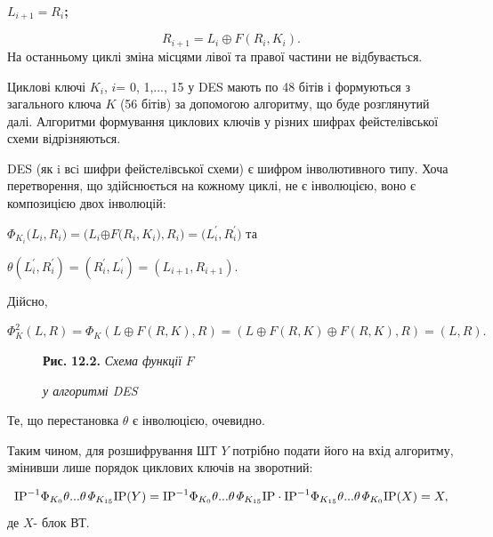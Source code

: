 \documentclass[a4paper]{article}
\newcounter{}
\newcommand\normalsubformula[1]{\text{\mathversion{normal}$#1$}}
\begin{document}
{\centering\bfseries
 ${L_{{i+1}}=R_{{i}}}$;
\par}

\begin{equation*}
{R_{{i+1}}=L_{{i}}{\oplus}F(R_{{i}},K_{{i}})\text{.}}
\end{equation*}
На останньому циклі зміна місцями лівої та правої частини не відбувається.

Циклові ключі  ${K_{{i}}}$,  ${i}$= 0, 1,..., 15 у DES мають по 48 бітів і
формуються з загального ключа  ${K}$ (56 бітів) за допомогою алгоритму, що буде
розглянутий далі. Алгоритми формування циклових ключів у різних шифрах
фейстелівської схеми відрізняються.

DES (як i всi шифри фейстелiвської схеми) є шифром  інволютивного типу. Хоча
перетворення, що здійснюється на кожному циклі, не є інволюцією, воно є
композицією  двох інволюцій:

{\centering
 ${\Phi
_{{K_{{i}}}}(L_{i}{,R_{i}}{)=(L_{i}}{{\oplus}F(R_{i}}{,K_{i}}{),R_{i}}{)=({L}_{i}^{'}}{,{R}_{i}^{'}}{)}}$\textbf{
 }та
\par}

{\centering
 ${\theta
({L}_{{i}}^{'},{R}_{{i}}^{'})=({R}_{{i}}^{'},{L}_{{i}}^{'})=(L_{{i+1}},R_{{i+1}})}$.
\par}

Дійсно,

 ${\Phi _{{K}}^{{2}}(L,R)=\Phi
_{{K}}(L{\oplus}F(R,K),R)=(L{\oplus}F(R,K){\oplus}F(R,K),R)=(L,R)\text{.}}$

\begin{figure}
\centering
\begin{minipage}{2.6445in}
{\centering
\textbf{Рис.}\textbf{ }\textbf{12.2.}\textbf{ }\textit{Схема функції } ${F}$
\par}

{\centering\itshape
у алгоритмі DES
\par}
\end{minipage}
\end{figure}
Те, що перестановка  ${\theta }$ є інволюцією, очевидно.

Таким чином, для розшифрування ШТ  ${Y}$ потрібно подати його на вхід алгоритму,
змінивши лише порядок циклових ключів на зворотний:

\begin{equation*}
{\normalsubformula{\text{IP}}^{{-1}}\Phi _{{K_{{0}}}}\theta
\text{.}\text{.}\text{.}\mathit{\theta \Phi
}_{K_{{\text{15}}}}{\normalsubformula{\text{IP}}(Y)=\normalsubformula{\text{IP}}^{-1}}{\Phi
_{K_{{0}}}}{\theta \text{.}\text{.}\text{.}\mathit{\theta \Phi
}_{K_{{\text{15}}}}}{\normalsubformula{\text{IP}}\cdot
\normalsubformula{\text{IP}}^{-1}}{\Phi _{K_{{\text{15}}}}}{\theta
\text{.}\text{.}\text{.}\mathit{\theta \Phi
}_{K_{{0}}}}{\normalsubformula{\text{IP}}(X)=X,}}
\end{equation*}
де  ${X}${}- блок ВТ.
\end{document}
